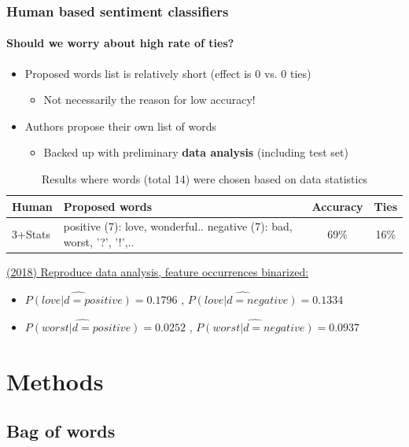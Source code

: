 \documentclass{beamer}
\begin{document}
\begin{frame}
	\frametitle{Human based sentiment classifiers}
	\framesubtitle{Should we worry about high rate of ties?}
	\begin{itemize}
		\item Proposed words list is relatively short (effect is 0 vs. 0 ties)
		\pause
		\begin{itemize}
			\item Not necessarily the reason for low accuracy!
		\end{itemize}
		\pause
		\item Authors propose their own list of words
		\begin{itemize}
			\item Backed up with preliminary \textbf{data analysis} (including test set)
		\end{itemize}
	\end{itemize}
	
	
	\pause
	\begin{table}
		\scriptsize
		\begin{tabular}{ l | p{5cm} | c | c }
			Human & Proposed words & Accuracy & Ties \\ \hline \hline
			3+Stats & positive (7): love, wonderful.. \newline negative (7): bad, worst, '?', '!',.. & 69\% & 16\% \\ \hline
		\end{tabular}
		\caption{Results where words (total 14) were chosen based on data statistics}
	\end{table}
	
	\pause
	\underline{	 (2018) Reproduce data analysis, feature occurrences binarized:}
	\begin{itemize}
		\small
		\item $\widehat{P(love|d=positive)} = 0.1796$ , $\widehat{P(love|d=negative)} = 0.1334$ \pause
		\item $\widehat{P(worst|d=positive)} = 0.0252$ , $\widehat{P(worst|d=negative)} = 0.0937$
	\end{itemize}
\end{frame}

\section{Methods}
\subsection{Bag of words}
\end{document}
